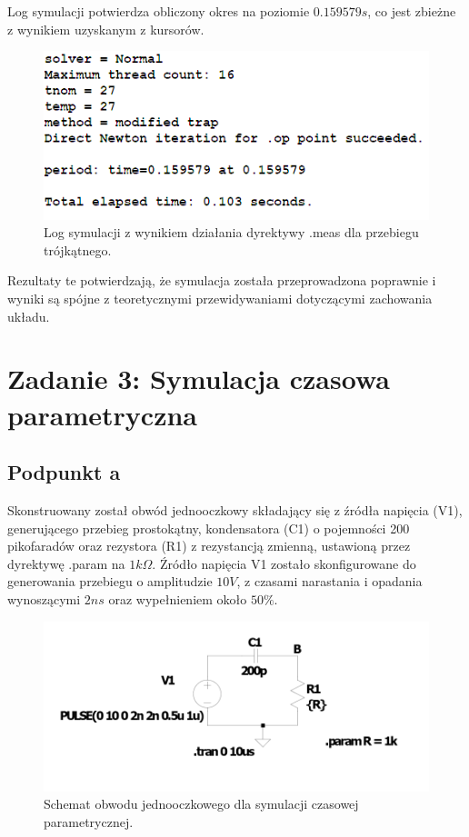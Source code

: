 \documentclass[10pt]{article}
\begin{document}
	Log symulacji potwierdza obliczony okres na poziomie \(0.159579s\), co jest zbieżne z wynikiem uzyskanym z kursorów.
	
	\begin{figure}[H]
		\centering
		\includegraphics[width=0.5\linewidth]{2clog.png}
		\caption{Log symulacji z wynikiem działania dyrektywy .meas dla przebiegu trójkątnego.}
		\label{fig:2clog}
	\end{figure}
	
	Rezultaty te potwierdzają, że symulacja została przeprowadzona poprawnie i wyniki są spójne z teoretycznymi przewidywaniami dotyczącymi zachowania układu.
	
	
	\pagebreak
	\section*{Zadanie 3: Symulacja czasowa parametryczna}
	\subsection*{Podpunkt a}
	Skonstruowany został obwód jednooczkowy składający się z źródła napięcia (V1), generującego przebieg prostokątny, kondensatora (C1) o pojemności 200 pikofaradów oraz rezystora (R1) z rezystancją zmienną, ustawioną przez dyrektywę .param na \(1 k\Omega\). Źródło napięcia V1 zostało skonfigurowane do generowania przebiegu o amplitudzie \(10 V\), z czasami narastania i opadania wynoszącymi \(2 ns\) oraz wypełnieniem około \(50\%\).
	
	\begin{figure}[H]
		\centering
		\includegraphics[width=\linewidth]{3aobwod}
		\caption{Schemat obwodu jednooczkowego dla symulacji czasowej parametrycznej.}
		\label{fig:3aobwod}
	\end{figure}
	
\end{document}

